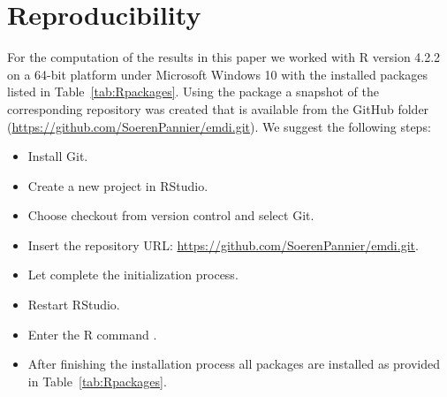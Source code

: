 \section{Reproducibility}
For the computation of the results in this paper we worked with R version 4.2.2  on a 64-bit platform under Microsoft Windows 10 with the installed packages listed in Table~\ref{tab:Rpackages}. Using the package  \citep{Ushey2018} a snapshot of the corresponding repository was created that is available from the GitHub folder (\url{https://github.com/SoerenPannier/emdi.git}). We suggest the following steps:
\begin{itemize}
	\item Install Git.
	\item Create a new project in RStudio.
	\item Choose checkout from version control and select Git.
	\item Insert the repository URL: \url{https://github.com/SoerenPannier/emdi.git}.
	\item Let  complete the initialization process.
	\item Restart RStudio.
	\item Enter the R command .
	\item After finishing the installation process all packages are installed as provided in Table~\ref{tab:Rpackages}.
\end{itemize}
%
